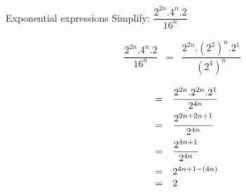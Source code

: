 \begin{wex}
{
Exponential expressions
}
{
Simplify: $\dfrac{2^{2n} .4^n . 2 }{ 16^n} $
}
{

\begin{eqnarray*}
\dfrac{2^{2n} . 4^n . 2 }{ 16^n} & = &\dfrac{2^{2n} . (2^2)^n . 2^1 }{ (2^4)^n} 
\end{eqnarray*}


\begin{equation*}
 \begin{array}{rcl}
   &= & \dfrac{ 2^{2n} . 2^{2n} . 2^1 }{ 2^{4n} } \vspace{5pt}\\
& = & \dfrac{ 2^{2n + 2n +1}}{2^{4n}} \vspace{5pt}\\
& = & \dfrac{2^{4n+1}}{2^{4n}} \vspace{5pt}\\
& = & 2^{4n+1-(4n)} \\
& = & 2
 \end{array}

\end{equation*}


 
}
\end{wex}


